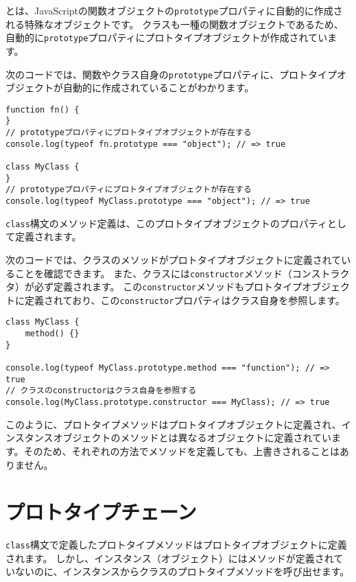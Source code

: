 \textbf{}とは、JavaScriptの関数オブジェクトの\texttt{prototype}プロパティに自動的に作成される特殊なオブジェクトです。
クラスも一種の関数オブジェクトであるため、自動的に\texttt{prototype}プロパティにプロトタイプオブジェクトが作成されています。

次のコードでは、関数やクラス自身の\texttt{prototype}プロパティに、プロトタイプオブジェクトが自動的に作成されていることがわかります。

\begin{lstlisting}
function fn() {
}
// prototypeプロパティにプロトタイプオブジェクトが存在する
console.log(typeof fn.prototype === "object"); // => true

class MyClass {
}
// prototypeプロパティにプロトタイプオブジェクトが存在する
console.log(typeof MyClass.prototype === "object"); // => true
\end{lstlisting}

\texttt{class}構文のメソッド定義は、このプロトタイプオブジェクトのプロパティとして定義されます。

次のコードでは、クラスのメソッドがプロトタイプオブジェクトに定義されていることを確認できます。
また、クラスには\texttt{constructor}メソッド（コンストラクタ）が必ず定義されます。
この\texttt{constructor}メソッドもプロトタイプオブジェクトに定義されており、この\texttt{constructor}プロパティはクラス自身を参照します。

\begin{lstlisting}
class MyClass {
    method() {}
}

console.log(typeof MyClass.prototype.method === "function"); // => true
// クラスのconstructorはクラス自身を参照する
console.log(MyClass.prototype.constructor === MyClass); // => true
\end{lstlisting}

このように、プロトタイプメソッドはプロトタイプオブジェクトに定義され、インスタンスオブジェクトのメソッドとは異なるオブジェクトに定義されています。そのため、それぞれの方法でメソッドを定義しても、上書きされることはありません。

\hypertarget{prototype-chain}{%
\section{プロトタイプチェーン}\label{prototype-chain}}

\texttt{class}構文で定義したプロトタイプメソッドはプロトタイプオブジェクトに定義されます。
しかし、インスタンス（オブジェクト）にはメソッドが定義されていないのに、インスタンスからクラスのプロトタイプメソッドを呼び出せます。

